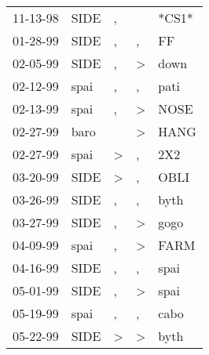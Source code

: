\begin{supertabular}{p{0.07\textwidth}p{0.06\textwidth}p{0.02\textwidth}p{0.02\textwidth}p{0.06\textwidth}}
 11-13-98\textsuperscript{} &           SIDE\textsuperscript{} &                , &                  &                            *CS1* \\
 01-28-99\textsuperscript{} &           SIDE\textsuperscript{} &                , &                , &             FF\textsuperscript{} \\
 02-05-99\textsuperscript{} &           SIDE\textsuperscript{} &                , &     \textgreater &           down\textsuperscript{} \\
 02-12-99\textsuperscript{} &           spai\textsuperscript{} &                , &                , &           pati\textsuperscript{} \\
 02-13-99\textsuperscript{} &           spai\textsuperscript{} &                , &     \textgreater &           NOSE\textsuperscript{} \\
 02-27-99\textsuperscript{} &           baro\textsuperscript{} &                  &     \textgreater &           HANG\textsuperscript{} \\
 02-27-99\textsuperscript{} &           spai\textsuperscript{} &     \textgreater &                , &            2X2\textsuperscript{} \\
 03-20-99\textsuperscript{} &           SIDE\textsuperscript{} &     \textgreater &                , &           OBLI\textsuperscript{} \\
 03-26-99\textsuperscript{} &           SIDE\textsuperscript{} &                , &                , &           byth\textsuperscript{} \\
 03-27-99\textsuperscript{} &           SIDE\textsuperscript{} &                , &     \textgreater &           gogo\textsuperscript{} \\
 04-09-99\textsuperscript{} &           spai\textsuperscript{} &                , &     \textgreater &           FARM\textsuperscript{} \\
 04-16-99\textsuperscript{} &           SIDE\textsuperscript{} &                , &                , &           spai\textsuperscript{} \\
 05-01-99\textsuperscript{} &           SIDE\textsuperscript{} &                , &     \textgreater &           spai\textsuperscript{} \\
 05-19-99\textsuperscript{} &           spai\textsuperscript{} &                , &                , &           cabo\textsuperscript{} \\
 05-22-99\textsuperscript{} &           SIDE\textsuperscript{} &     \textgreater &     \textgreater &           byth\textsuperscript{} \\

\end{supertabular}
